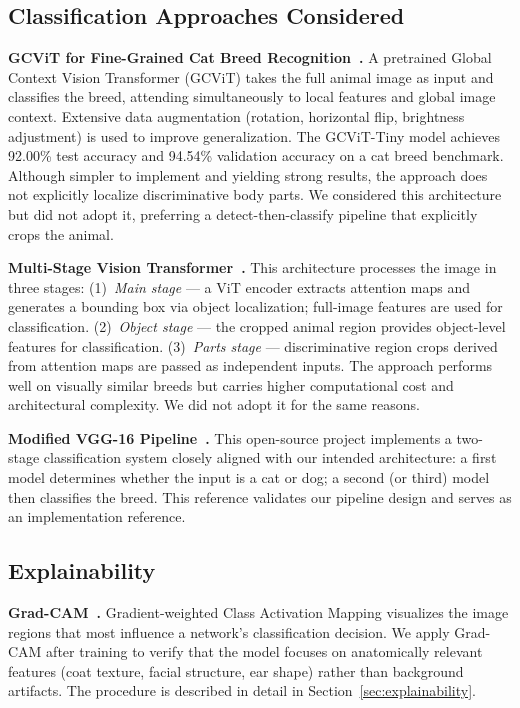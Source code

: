 \documentclass[10pt,twocolumn,letterpaper]{article}
\begin{document}
\subsection{Classification Approaches Considered}

\textbf{GCViT for Fine-Grained Cat Breed Recognition~\cite{gcvit_2026}.}
A pretrained Global Context Vision Transformer (GCViT) takes the full animal image as input and classifies the breed, attending simultaneously to local features and global image context. Extensive data augmentation (rotation, horizontal flip, brightness adjustment) is used to improve generalization. The GCViT-Tiny model achieves 92.00\% test accuracy and 94.54\% validation accuracy on a cat breed benchmark. Although simpler to implement and yielding strong results, the approach does not explicitly localize discriminative body parts. We considered this architecture but did not adopt it, preferring a detect-then-classify pipeline that explicitly crops the animal.

\textbf{Multi-Stage Vision Transformer~\cite{transfg_2021}.}
This architecture processes the image in three stages: (1)~\textit{Main stage} — a ViT encoder extracts attention maps and generates a bounding box via object localization; full-image features are used for classification. (2)~\textit{Object stage} — the cropped animal region provides object-level features for classification. (3)~\textit{Parts stage} — discriminative region crops derived from attention maps are passed as independent inputs. The approach performs well on visually similar breeds but carries higher computational cost and architectural complexity. We did not adopt it for the same reasons.

\textbf{Modified VGG-16 Pipeline~\cite{vgg16_github}.}
This open-source project implements a two-stage classification system closely aligned with our intended architecture: a first model determines whether the input is a cat or dog; a second (or third) model then classifies the breed. This reference validates our pipeline design and serves as an implementation reference.

\subsection{Explainability}

\textbf{Grad-CAM~\cite{gradcam_matlab,gradcam_omnixai}.}
Gradient-weighted Class Activation Mapping visualizes the image regions that most influence a network's classification decision. We apply Grad-CAM after training to verify that the model focuses on anatomically relevant features (coat texture, facial structure, ear shape) rather than background artifacts. The procedure is described in detail in Section~\ref{sec:explainability}.
\end{document}
